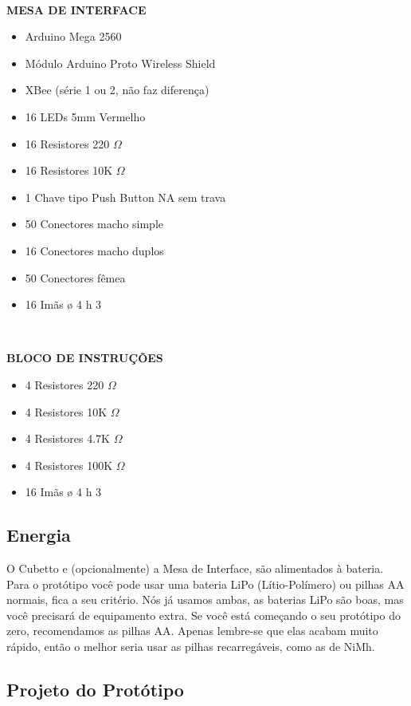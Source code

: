 \documentclass[paper=a4, fontsize=11pt]{scrartcl} %
\numberwithin{equation}{section} %
\numberwithin{figure}{section} %
\numberwithin{table}{section} %
\begin{document}
\

\textbf{MESA DE INTERFACE}


\begin{itemize}
\item Arduino Mega 2560
\item Módulo Arduino Proto Wireless Shield 
\item XBee (série 1 ou 2, não faz diferença) 
\item 16 LEDs 5mm Vermelho
\item 16 Resistores 220 $\Omega$
\item 16 Resistores 10K $\Omega$ 
\item 1 Chave tipo Push Button NA sem trava
\item 50 Conectores macho simple
\item 16 Conectores macho duplos
\item 50 Conectores fêmea
\item 16 Imãs ø 4 h 3
\end{itemize} 

\

\textbf{BLOCO DE INSTRUÇÕES}


\begin{itemize}

\item 4 Resistores 220 $\Omega$
\item 4 Resistores 10K $\Omega$ 
\item 4 Resistores 4.7K $\Omega$
\item 4 Resistores 100K $\Omega$
\item 16 Imãs ø 4 h 3
\end{itemize} 



\subsection{Energia}

O Cubetto e (opcionalmente) a Mesa de Interface, são alimentados à bateria. Para o protótipo você pode usar uma bateria LiPo (Lítio-Polímero) ou pilhas AA normais, fica a seu critério. Nós já usamos ambas, as baterias LiPo são boas, mas você precisará de equipamento extra. Se você está começando o seu protótipo do zero, recomendamos as pilhas AA. Apenas lembre-se que elas acabam muito rápido, então o melhor seria usar as pilhas recarregáveis, como as de NiMh.

\subsection{Projeto do Protótipo}
\end{document}

